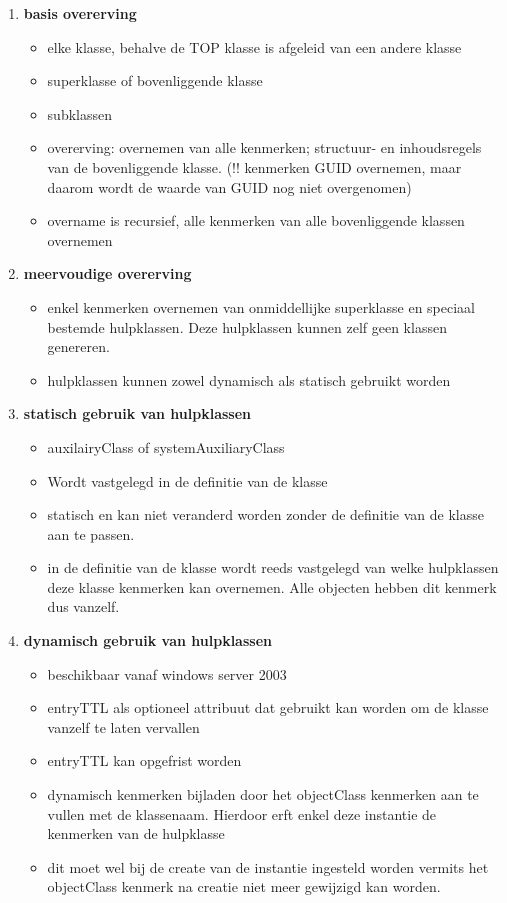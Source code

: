 \begin{enumerate}
\item \textbf{basis overerving}
\begin{itemize}
\item elke klasse, behalve de TOP klasse is afgeleid van een andere klasse
\item superklasse of bovenliggende klasse
\item subklassen 
\item overerving: overnemen van alle kenmerken; structuur- en inhoudsregels van de bovenliggende klasse. (!! kenmerken GUID overnemen, maar daarom wordt de waarde van GUID nog niet overgenomen)
\item overname is recursief, alle kenmerken van alle bovenliggende klassen overnemen
\end{itemize}

\item \textbf{meervoudige overerving}
\begin{itemize}
\item enkel kenmerken overnemen van onmiddellijke superklasse en speciaal bestemde hulpklassen.
Deze hulpklassen kunnen zelf geen klassen genereren.
\item hulpklassen kunnen zowel dynamisch als statisch gebruikt worden
\end{itemize}

\item \textbf{statisch gebruik van hulpklassen}
\begin{itemize}
\item auxilairyClass of systemAuxiliaryClass
\item Wordt vastgelegd in de definitie van de klasse
\item statisch en kan niet veranderd worden zonder de definitie van de klasse aan te passen.
\item in de definitie van de klasse wordt reeds vastgelegd van welke hulpklassen deze klasse kenmerken kan overnemen. Alle objecten hebben dit kenmerk dus vanzelf.
\end{itemize}

\item \textbf{dynamisch gebruik van hulpklassen}
\begin{itemize}
\item beschikbaar vanaf windows server 2003
\item entryTTL als optioneel attribuut dat gebruikt kan worden om de klasse vanzelf te laten vervallen
\item entryTTL kan opgefrist worden
\item dynamisch kenmerken bijladen door het objectClass kenmerken aan te vullen met de klassenaam. Hierdoor erft enkel deze instantie de kenmerken van de hulpklasse
\item dit moet wel bij de create van de instantie ingesteld worden vermits het objectClass kenmerk na creatie niet meer gewijzigd kan worden.
\end{itemize}

\end{enumerate}
